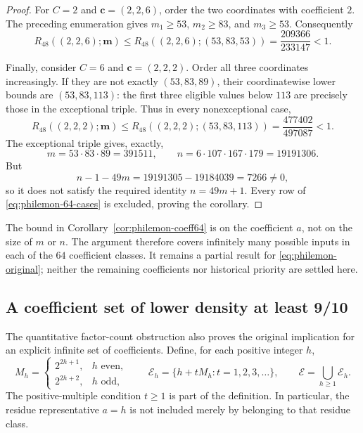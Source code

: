 \documentclass[11pt,a4paper]{article}
\theoremstyle{definition}\newtheorem{definition}[theorem]{Definition}
\theoremstyle{remark}\newtheorem{remark}[theorem]{Remark}
\begin{document}
\begin{proof}
For $C=2$ and $\boldsymbol c=(2,2,6)$, order the two coordinates with
coefficient $2$.  The preceding enumeration gives
$m_1\geq53$, $m_2\geq83$, and $m_3\geq53$.  Consequently
\begin{equation}\label{eq:philemon-64-bound49a}
 R_{48}((2,2,6);\boldsymbol m)
 \leq R_{48}((2,2,6);(53,83,53))
 =\frac{209366}{233147}<1.
\end{equation}

Finally, consider $C=6$ and $\boldsymbol c=(2,2,2)$.
Order all three coordinates increasingly.  If they are not exactly
$(53,83,89)$, their coordinatewise lower bounds are $(53,83,113)$:
the first three eligible values below $113$ are precisely those in
the exceptional triple.  Thus in every nonexceptional case,
\begin{equation}\label{eq:philemon-64-bound49b}
 R_{48}((2,2,2);\boldsymbol m)
 \leq R_{48}((2,2,2);(53,83,113))
 =\frac{477402}{497087}<1.
\end{equation}
The exceptional triple gives, exactly,
\[
 m=53\cdot83\cdot89=391511,
 \qquad n=6\cdot107\cdot167\cdot179=19191306.
\]
But
\begin{equation}\label{eq:philemon-64-exception}
 n-1-49m=19191305-19184039=7266\ne0,
\end{equation}
so it does not satisfy the required identity $n=49m+1$.
Every row of \eqref{eq:philemon-64-cases} is excluded, proving the
corollary.
\end{proof}

The bound in Corollary~\ref{cor:philemon-coeff64} is on the coefficient
$a$, not on the size of $m$ or $n$.  The argument therefore covers
infinitely many possible inputs in each of the $64$ coefficient classes.
It remains a partial result for \eqref{eq:philemon-original}; neither
the remaining coefficients nor historical priority are settled here.


\subsection{A coefficient set of lower density at least 9/10}
\label{sec:philemon-density}

The quantitative factor-count obstruction also proves the original
implication for an explicit infinite set of coefficients.  Define, for
each positive integer $h$,
\[
 M_h=
 \begin{cases}
  2^{2h+1},&h\text{ even},\\
  2^{2h+2},&h\text{ odd},
 \end{cases}
 \qquad
 \mathcal E_h=\{h+tM_h:t=1,2,3,\ldots\},
 \qquad
 \mathcal E=\bigcup_{h\geq1}\mathcal E_h.
\]
The positive-multiple condition $t\geq1$ is part of the definition.
In particular, the residue representative $a=h$ is not included merely
by belonging to that residue class.
\end{document}
